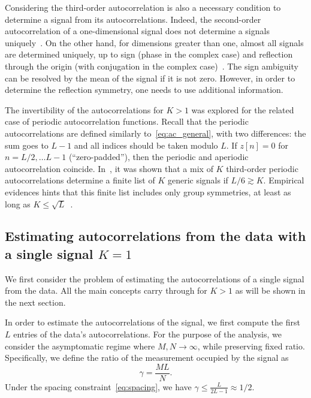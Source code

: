 \documentclass[english,11pt]{article}
\numberwithin{equation}{section}
\theoremstyle{plain}
\theoremstyle{definition}
\theoremstyle{remark}
\theoremstyle{plain}
\theoremstyle{remark}
\theoremstyle{plain}
\theoremstyle{plain}
\begin{document}
Considering the third-order autocorrelation is also a necessary condition to determine a signal from its autocorrelations. Indeed, the second-order autocorrelation of a one-dimensional signal does not determine a signals uniquely~\cite{beinert2015ambiguities,bendory2017fourier}. On the other hand, for dimensions greater than one, almost all signals are determined uniquely, up to sign (phase in the complex case) and reflection through the origin (with conjugation in the complex case)~\cite{hayes1982reconstruction,hayes1982reducible}. The sign ambiguity can be resolved by the mean of the signal if it is not zero. However,  in order to determine the reflection symmetry, one needs to use additional information.

The invertibility of the autocorrelations for $K>1$ was explored  for the related case of  periodic autocorrelation functions. Recall that the  periodic autocorrelations are defined similarly to~\eqref{eq:ac_general}, with two differences: the sum goes to $L-1$ and all indices should be taken modulo $L$.
If $z[n]=0$ for $n=L/2,\ldots L-1$ (``zero-padded''), then the periodic and aperiodic autocorrelation coincide.
In~\cite{bandeira2017estimation}, it was shown that a mix of $K$ third-order periodic autocorrelations determine  a finite list of $K$ generic signals if $L/6\gtrsim K$. Empirical evidences hints that this finite list includes only group symmetries, at least as long as $K\leq\sqrt{L}$~\cite{boumal2017heterogeneous}. 


\subsection{Estimating autocorrelations from the data with a single signal $K=1$} \label{sec:estimating_ac_k1}

We first consider the problem of estimating the autocorrelations of a single signal from the data. 
All the main concepts carry through for $K>1$ as will be shown in the next section.  

In order to estimate the autocorrelations of the signal, we first compute the first $L$ entries of the data's autocorrelations. 
For the purpose of the analysis, we consider  the asymptomatic regime where $M,N\to\infty$, while preserving fixed ratio. 
Specifically, we define the ratio of the measurement occupied by  the signal as
\begin{equation}
\gamma = \frac{M L}{N}.
\end{equation}
Under the spacing constraint~\eqref{eq:spacing}, we have $\gamma\leq\frac{L}{2L-1}\approx 1/2$.
\end{document}
